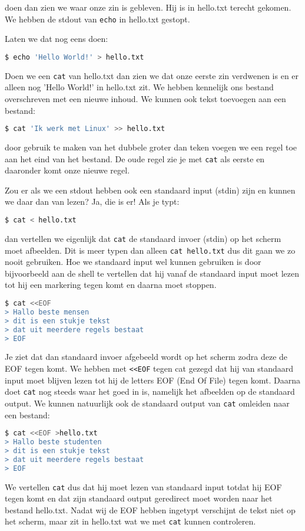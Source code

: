 doen dan zien we waar onze zin is gebleven. Hij is in hello.txt terecht gekomen. We hebben de stdout van \texttt{echo} in hello.txt gestopt.

Laten we dat nog eens doen:

\begin{lstlisting}[language=bash]
$ echo 'Hello World!' > hello.txt
\end{lstlisting}

Doen we een \texttt{cat} van hello.txt dan zien we dat onze eerste zin verdwenen is en er alleen nog 'Hello World!' in hello.txt zit. We hebben kennelijk ons bestand overschreven met een nieuwe inhoud. We kunnen ook tekst toevoegen aan een bestand:

\begin{lstlisting}[language=bash]
$ cat 'Ik werk met Linux' >> hello.txt
\end{lstlisting}

door gebruik te maken van het dubbele groter dan teken voegen we een regel toe aan het eind van het bestand. De oude regel zie je met \texttt{cat} als eerste en daaronder komt onze nieuwe regel.

Zou er als we een stdout hebben ook een standaard input (stdin) zijn en kunnen we daar dan van lezen? Ja, die is er! Als je
typt:

\begin{lstlisting}[language=bash]
$ cat < hello.txt
\end{lstlisting}

dan vertellen we eigenlijk dat \texttt{cat} de standaard invoer (stdin) op het scherm moet afbeelden. Dit is meer typen dan alleen \texttt{cat hello.txt} dus dit gaan we zo nooit gebruiken. Hoe we standaard input wel kunnen gebruiken is door bijvoorbeeld aan de shell te vertellen dat hij vanaf de standaard input moet lezen tot hij een markering tegen komt en daarna moet stoppen.
\begin{lstlisting}[language=bash]
$ cat <<EOF
> Hallo beste mensen
> dit is een stukje tekst
> dat uit meerdere regels bestaat
> EOF
\end{lstlisting}
Je ziet dat dan standaard invoer afgebeeld wordt op het scherm zodra deze de EOF tegen komt. We hebben met \texttt{<<EOF} tegen cat gezegd dat hij van standaard input moet blijven lezen tot hij de letters EOF (End Of File) tegen komt. Daarna doet \texttt{cat} nog steeds waar het goed in is, namelijk het afbeelden op de standaard output. We kunnen natuurlijk ook de standaard output van \texttt{cat} omleiden naar een bestand:
\begin{lstlisting}[language=bash]
$ cat <<EOF >hello.txt
> Hallo beste studenten
> dit is een stukje tekst
> dat uit meerdere regels bestaat
> EOF
\end{lstlisting}
We vertellen \texttt{cat} dus dat hij moet lezen van standaard input totdat hij EOF tegen komt en dat zijn standaard output geredirect moet worden naar het bestand hello.txt. Nadat wij de EOF hebben ingetypt verschijnt de tekst niet op het scherm, maar zit in hello.txt wat we met \texttt{cat} kunnen controleren.

